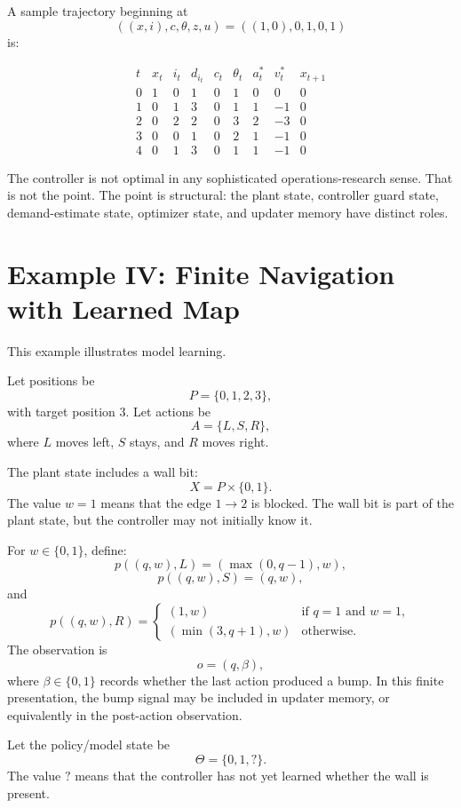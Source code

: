 A sample trajectory beginning at
\[
((x,i),c,\theta,z,u)=((1,0),0,1,0,1)
\]
is:

\[
\begin{array}{c|c|c|c|c|c|c|c|c}
t & x_t & i_t & d_{i_t} & c_t & \theta_t & a_t^* & v_t^* & x_{t+1} \\
\hline
0 & 1 & 0 & 1 & 0 & 1 & 0 & 0 & 0 \\
1 & 0 & 1 & 3 & 0 & 1 & 1 & -1 & 0 \\
2 & 0 & 2 & 2 & 0 & 3 & 2 & -3 & 0 \\
3 & 0 & 0 & 1 & 0 & 2 & 1 & -1 & 0 \\
4 & 0 & 1 & 3 & 0 & 1 & 1 & -1 & 0
\end{array}
\]

The controller is not optimal in any sophisticated operations-research sense.  That is not the point.
The point is structural: the plant state, controller guard state, demand-estimate state, optimizer
state, and updater memory have distinct roles.

\section{Example IV: Finite Navigation with Learned Map}
\label{sec:example-navigation-learned-map}

This example illustrates model learning.

Let positions be
\[
P=\{0,1,2,3\},
\]
with target position \(3\).  Let actions be
\[
A=\{L,S,R\},
\]
where \(L\) moves left, \(S\) stays, and \(R\) moves right.

The plant state includes a wall bit:
\[
X=P\times\{0,1\}.
\]
The value \(w=1\) means that the edge \(1\to 2\) is blocked.  The wall bit is part of the plant
state, but the controller may not initially know it.

For \(w\in\{0,1\}\), define:
\[
p((q,w),L)=(\max(0,q-1),w),
\]
\[
p((q,w),S)=(q,w),
\]
and
\[
p((q,w),R)=
\begin{cases}
(1,w) & \text{if } q=1 \text{ and } w=1,\\
(\min(3,q+1),w) & \text{otherwise}.
\end{cases}
\]
The observation is
\[
o=(q,\beta),
\]
where \(\beta\in\{0,1\}\) records whether the last action produced a bump.  In this finite
presentation, the bump signal may be included in updater memory, or equivalently in the post-action
observation.

Let the policy/model state be
\[
\Theta=\{0,1,?\}.
\]
The value \(?\) means that the controller has not yet learned whether the wall is present.

